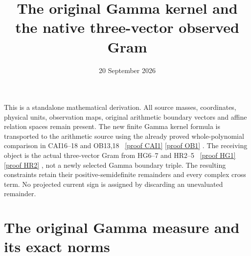 \documentclass[11pt]{article}
\title{The original Gamma kernel and the native three-vector observed Gram}
\author{}
\date{20 September 2026}
\begin{document}
\maketitle

This is a standalone mathematical derivation.  All source masses,
coordinates, physical units, observation maps, original arithmetic boundary
vectors and affine relation spaces remain present.  The new finite Gamma
kernel formula is transported to the arithmetic source using the already
proved whole-polynomial comparison in CAI16--18 and OB13,18
\cite{CAI,OB}%
~\href{https://github.com/KokunoYumeto/zeta-function-research-reader/blob/487253b5b01851da5b9b98af4e146fecf1fab902/workbenches/splitzero-tandem/continuations/20260919-full-window-source-products/providers/CAI_COMPLETE_PREREQUISITE.tex\#L46}{[proof CAI1]} \href{https://github.com/KokunoYumeto/zeta-function-research-reader/blob/5992ad50c0f2a06921f1fcaded7b4e38097c0739/workbenches/splitzero-tandem/continuations/20260920-original-kernel-mixed-determinants/providers/OBSERVED_CLASS_RETURN.tex\#L13}{[proof OB1]}%
{}.  The receiving object is the actual three-vector Gram from
HG6--7 and HR2--5 \cite{HG,HR}%
~\href{https://github.com/KokunoYumeto/zeta-function-research-reader/blob/5992ad50c0f2a06921f1fcaded7b4e38097c0739/workbenches/splitzero-tandem/continuations/20260920-original-kernel-mixed-determinants/providers/HEAT_GROWTH_AND_ORIGINAL_CURRENTS.tex\#L31}{[proof HG1]} \href{https://github.com/KokunoYumeto/zeta-function-research-reader/blob/5992ad50c0f2a06921f1fcaded7b4e38097c0739/workbenches/splitzero-tandem/continuations/20260920-original-kernel-mixed-determinants/providers/HEAT_OBSERVATION_RESPONSE_ERRORS.tex\#L32}{[proof HR2]}%
{}, not a newly selected Gamma boundary triple.
The resulting constraints retain their positive-semidefinite remainders
and every complex cross term.  No projected current sign is assigned by
discarding an unevaluated remainder.

\section{The original Gamma measure and its exact norms}
\end{document}
